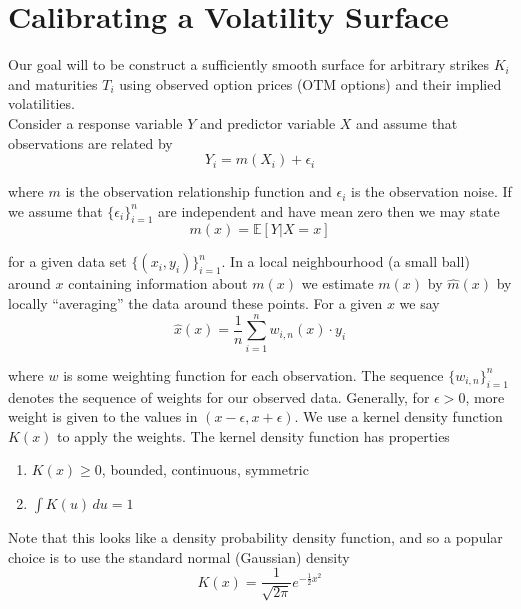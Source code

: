 \documentclass[12pt]{article}
\newlength\tindent
\renewcommand{\indent}{\hspace*{\tindent}}
\begin{document}
\section{Calibrating a Volatility Surface}

\indent Our goal will to be construct a sufficiently smooth surface for arbitrary strikes $K_i$ and maturities $T_i$ using observed option prices (OTM options) and their implied volatilities. \\

\indent Consider a response variable $Y$ and predictor variable $X$ and assume that observations are related by
\begin{equation*}
	Y_i = m(X_i) + \epsilon_i
\end{equation*}

where $m$ is the observation relationship function and $\epsilon_i$ is the observation noise. If we assume that $\{\epsilon_i\}_{i=1}^n$ are independent and have mean zero then we may state
\begin{equation*}
	m(x) = \mathbb E[Y|X = x]
\end{equation*}

for a given data set $\{(x_i,y_i)\}^n_{i=1}$. In a local neighbourhood (a small ball) around $x$ containing information about $m(x)$ we estimate $m(x)$ by $\hat{m}(x)$ by locally ``averaging'' the data around these points. For a given $x$ we say
\begin{equation*}
	\hat{x}(x) = \frac{1}{n}\sum^n_{i=1} w_{i,n}(x)\cdot y_i
\end{equation*}

where $w$ is some weighting function for each observation. The sequence $\{w_{i,n}\}_{i=1}^n$ denotes the sequence of weights for our observed data. Generally, for $\epsilon > 0$, more weight is given to the values in $(x - \epsilon, x + \epsilon)$. We use a kernel density function $K(x)$ to apply the weights. The kernel density function has properties
\begin{enumerate}
	\item $K(x) \geq 0$, bounded, continuous, symmetric
	\item $\int K(u)\,du = 1$
\end{enumerate}

\indent Note that this looks like a density probability density function, and so a popular choice is to use the standard normal (Gaussian) density
\begin{equation*}
	K(x) = \frac{1}{\sqrt{2\pi}}e^{-\frac{1}{2}x^2}
\end{equation*}
\end{document}
